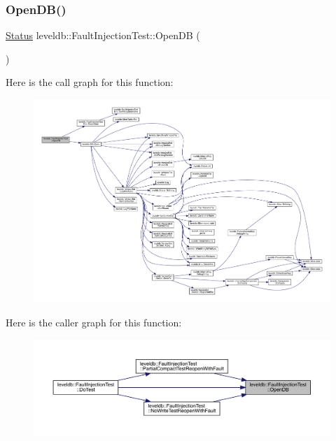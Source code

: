 \subsubsection{\texorpdfstring{OpenDB()}{OpenDB()}}
{\footnotesize\ttfamily \mbox{\hyperlink{classleveldb_1_1_status}{Status}} leveldb\+::\+Fault\+Injection\+Test\+::\+Open\+DB (\begin{DoxyParamCaption}{ }\end{DoxyParamCaption})\hspace{0.3cm}{\ttfamily [inline]}}

Here is the call graph for this function\+:
\nopagebreak
\begin{figure}[H]
\begin{center}
\leavevmode
\includegraphics[width=350pt]{classleveldb_1_1_fault_injection_test_af81cf86b19e72e08bdee141a612e6b77_cgraph}
\end{center}
\end{figure}
Here is the caller graph for this function\+:
\nopagebreak
\begin{figure}[H]
\begin{center}
\leavevmode
\includegraphics[width=350pt]{classleveldb_1_1_fault_injection_test_af81cf86b19e72e08bdee141a612e6b77_icgraph}
\end{center}
\end{figure}
\mbox{\label{classleveldb_1_1_fault_injection_test_a9a3c0876a2caae54ccbae754794f262c}} 
